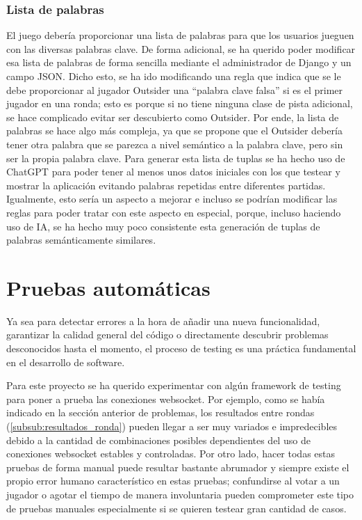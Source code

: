 \subsubsection{Lista de palabras}
El juego debería proporcionar una lista de palabras para que los usuarios jueguen con las 
diversas palabras clave. De forma adicional, se ha querido poder modificar esa lista de palabras de forma sencilla mediante el administrador de Django y un campo JSON.
Dicho esto, se ha ido modificando una regla que indica que se le debe proporcionar al jugador Outsider una ``palabra clave falsa'' si es el primer jugador en una ronda; esto es porque si 
no tiene ninguna clase de pista adicional, se hace complicado evitar ser descubierto como Outsider. Por ende, la lista de palabras se hace algo más compleja, ya que se propone que el Outsider
debería tener otra palabra que se parezca a nivel semántico a la palabra clave, pero sin ser la propia palabra clave. Para generar esta lista de tuplas se ha hecho uso de ChatGPT \cite{ChatGPT} para
poder tener al menos unos datos iniciales con los que testear y mostrar la aplicación evitando palabras repetidas entre diferentes partidas. Igualmente, esto sería un aspecto a mejorar e incluso
se podrían modificar las reglas para poder tratar con este aspecto en especial, porque, incluso haciendo uso de IA, se ha hecho muy poco consistente esta generación de tuplas de palabras semánticamente similares.



\section{Pruebas automáticas}

Ya sea para detectar errores a la hora de añadir una nueva funcionalidad, garantizar la calidad general del código o directamente
descubrir problemas desconocidos hasta el momento, el proceso de testing es una práctica fundamental en el desarrollo de
software.

Para este proyecto se ha querido experimentar con algún framework de testing para poner a prueba las conexiones websocket. Por ejemplo, como se había indicado
en la sección anterior de problemas, los resultados entre rondas (\ref{subsub:resultados_ronda}) pueden llegar a ser muy variados e impredecibles debido a la cantidad de combinaciones
posibles dependientes del uso de conexiones websocket estables y controladas. Por otro lado, hacer todas estas pruebas de forma manual puede resultar 
bastante abrumador y siempre existe el propio error humano característico en estas pruebas; confundirse al votar a un jugador o agotar el tiempo de manera
involuntaria pueden comprometer este tipo de pruebas manuales especialmente si se quieren testear gran cantidad de casos.

